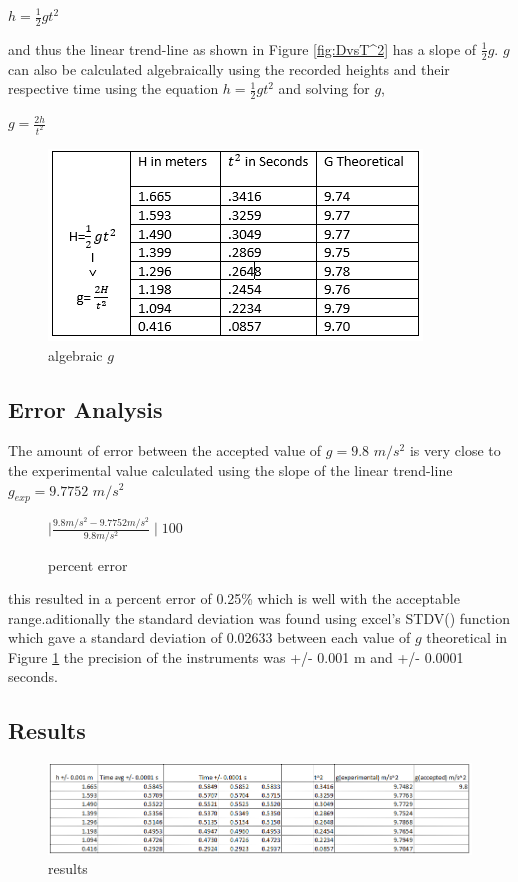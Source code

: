 \documentclass[12pt]{report}
\begin{document}
\begin{center}
$h = \frac{1}{2}gt^{2}$
\end{center}
 and thus the linear trend-line as shown in Figure \ref{fig:DvsT^2} has a slope of $\frac{1}{2}g$. $g$ can also be calculated algebraically using the recorded heights and their respective time using the equation $h = \frac{1}{2}gt^{2}$ and solving for $g$, 
\begin{center}
$g = \frac{2h}{t^2}$
\end{center}
\begin{figure}[H]
    \centering
    \includegraphics[width=\textwidth]{gravityTable}
    \caption{algebraic $g$}
    \label{fig:gravityTable}
\end{figure}

\subsection{Error Analysis}
The amount of error between the accepted value of $g = 9.8$ $m/s^2$ is very close to the experimental value calculated using the slope of the linear trend-line $g_{exp} = 9.7752$ $m/s^2$
\begin{figure}[H]
\begin{center}
$\mid{} \frac{9.8 m/s^2 -9.7752 m/s^2}{9.8 m/s^2}\mid100$
\label{fig:Percent Error}
\caption{percent error}
\end{center}
\end{figure}

this resulted in a percent error of 0.25\% which is well with the acceptable range.aditionally the standard deviation was found using excel's STDV() function which gave a standard deviation of 0.02633 between each value of $g$ theoretical in Figure \ref{fig:gravityTable} the precision of the instruments was +/- 0.001 m and +/- 0.0001 seconds.
 
\subsection{Results}
\begin{figure}[H]
    \centering
    \includegraphics[width=1.25\textwidth]{results}
    \caption{results}
    \label{fig:results}
\end{figure}
\end{document}
